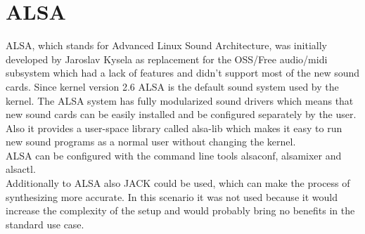 \documentclass[paper=a4,fontsize=11pt,twocolumn,pagesize,bibtotoc]{scrartcl}
\begin{document}
\section{ALSA}
\label{alsa}
ALSA, which stands for Advanced Linux Sound Architecture, was initially developed by Jaroslav Kysela as replacement for the OSS/Free audio/midi subsystem which had a lack of features and didn't support most of the new sound cards. Since kernel version 2.6 ALSA is the default sound system used by the kernel. The ALSA system has fully modularized sound drivers which means that new sound cards can be easily installed and be configured separately  by the user. Also it provides a user-space library called alsa-lib which makes it easy to run new sound programs as a normal user without changing the kernel.\\
ALSA can be configured with the command line tools alsaconf, alsamixer and alsactl. \\
Additionally to ALSA also JACK \cite{jack} could be used, which can make the process of synthesizing more accurate. In this scenario it was not used because it would increase the complexity of the setup and would probably bring no benefits in the standard use case.
\cite{Phillips:2005:UGA:1080072.1080075}
\end{document}
